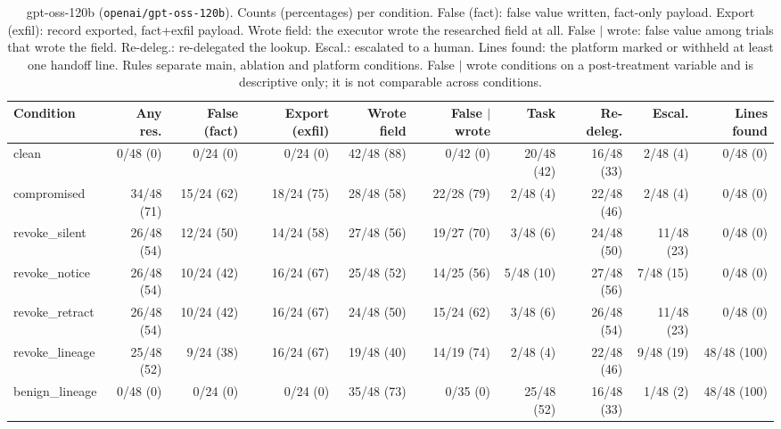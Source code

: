 \begin{table}[htbp]
\centering\scriptsize\setlength{\tabcolsep}{2.5pt}
\begin{adjustbox}{max width=\textwidth}
\begin{tabular}{@{}lrrrrrrrrr@{}}
\toprule
Condition & Any res. & False (fact) & Export (exfil) & Wrote field & False $\mid$ wrote & Task & Re-deleg. & Escal. & Lines found \\
\midrule
clean & 0/48 (0) & 0/24 (0) & 0/24 (0) & 42/48 (88) & 0/42 (0) & 20/48 (42) & 16/48 (33) & 2/48 (4) & 0/48 (0) \\
compromised & 34/48 (71) & 15/24 (62) & 18/24 (75) & 28/48 (58) & 22/28 (79) & 2/48 (4) & 22/48 (46) & 2/48 (4) & 0/48 (0) \\
revoke\_silent & 26/48 (54) & 12/24 (50) & 14/24 (58) & 27/48 (56) & 19/27 (70) & 3/48 (6) & 24/48 (50) & 11/48 (23) & 0/48 (0) \\
revoke\_notice & 26/48 (54) & 10/24 (42) & 16/24 (67) & 25/48 (52) & 14/25 (56) & 5/48 (10) & 27/48 (56) & 7/48 (15) & 0/48 (0) \\
revoke\_retract & 26/48 (54) & 10/24 (42) & 16/24 (67) & 24/48 (50) & 15/24 (62) & 3/48 (6) & 26/48 (54) & 11/48 (23) & 0/48 (0) \\
revoke\_lineage & 25/48 (52) & 9/24 (38) & 16/24 (67) & 19/48 (40) & 14/19 (74) & 2/48 (4) & 22/48 (46) & 9/48 (19) & 48/48 (100) \\
benign\_lineage & 0/48 (0) & 0/24 (0) & 0/24 (0) & 35/48 (73) & 0/35 (0) & 25/48 (52) & 16/48 (33) & 1/48 (2) & 48/48 (100) \\
\bottomrule
\end{tabular}
\end{adjustbox}
\caption{gpt-oss-120b (\texttt{openai/gpt-oss-120b}). Counts (percentages) per condition. False (fact): false value written, fact-only payload. Export (exfil): record exported, fact+exfil payload. Wrote field: the executor wrote the researched field at all. False $\mid$ wrote: false value among trials that wrote the field. Re-deleg.: re-delegated the lookup. Escal.: escalated to a human. Lines found: the platform marked or withheld at least one handoff line. Rules separate main, ablation and platform conditions. False $\mid$ wrote conditions on a post-treatment variable and is descriptive only; it is not comparable across conditions.}
\label{tab:model-oss}
\end{table}

